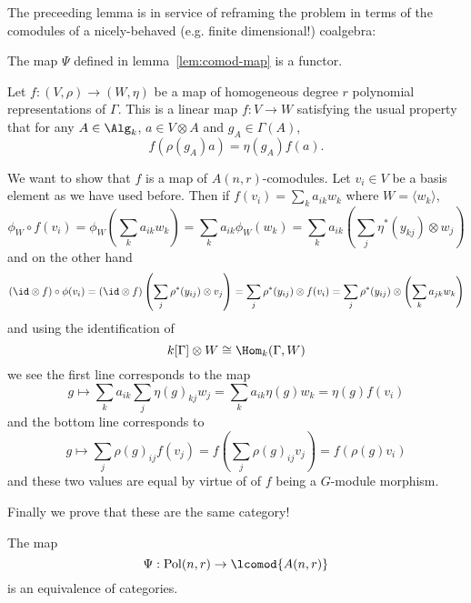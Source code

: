 \documentclass[12pt]{article}
\DeclareMathOperator{\Pol}{Pol}
\begin{document}
The preceeding lemma is in service of reframing the problem in terms of the comodules of a nicely-behaved (e.g. finite dimensional!) coalgebra:
\begin{lem}
	The map $\Psi$ defined in lemma~\ref{lem:comod-map} is a functor.
\end{lem}
\begin{prf}
	Let $f:(V,\rho)\to (W,\eta)$ be a map of homogeneous degree $r$ polynomial representations of $\Gamma$. This is a linear map $f:V\to W$ 
	satisfying the usual property that for any $A\in\Alg_k$, $a\in V\otimes A$ and $g_A\in \Gamma(A)$,
	\[f(\rho(g_A)a)=\eta(g_A)f(a).\]

	We want to show that $f$ is a map of $A(n,r)$-comodules. Let $v_i\in V$ be a basis element as we have used before. Then if $f(v_i)=\sum_k a_{ik}w_{k}$ where $W=\langle w_k\rangle$,
	\[\phi_W\circ f(v_i)=\phi_W\left(\sum_ka_{ik}w_k\right)=\sum_ka_{ik}\phi_W(w_k)=\sum_ka_{ik}\left(\sum_j \eta^\ast(y_{kj})\otimes w_j\right)\]
	and on the other hand 
	\[(\id\otimes f)\circ\phi(v_i)=(\id\otimes f)\left(\sum_j\rho^\ast(y_{ij})\otimes v_j\right)=\sum_j\rho^\ast(y_{ij})\otimes f(v_i)=\sum_j\rho^\ast(y_{ij})\otimes\left(\sum _ka_{jk}w_k\right)\]
	and using the identification of 
	\[k[\Gamma]\otimes W\cong \Hom_k(\Gamma,W)\]
	we see the first line corresponds to the map 
	\[g\mapsto \sum_ka_{ik}\sum_j\eta(g)_{kj}w_j=\sum_ka_{ik}\eta(g)w_k=\eta(g)f(v_i)\]
	and the bottom line corresponds to 
	\[g\mapsto \sum_j\rho(g)_{ij}f(v_j)=f\left(\sum_j\rho(g)_{ij}v_j\right)=f(\rho(g)v_i)\]
	and these two values are equal by virtue of of $f$ being a $G$-module morphism.
\end{prf}
Finally we prove that these are the same category!
\begin{thm}
	The map
	\[\Psi:\Pol(n,r)\to \lcomod{A(n,r)}\]
	is an equivalence of categories.
\end{thm}
\end{document}

